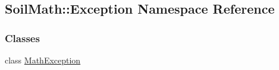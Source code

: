 \hypertarget{namespace_soil_math_1_1_exception}{}\subsection{Soil\+Math\+:\+:Exception Namespace Reference}
\label{namespace_soil_math_1_1_exception}
\subsubsection*{Classes}
\begin{DoxyCompactItemize}
\item 
class \hyperlink{class_soil_math_1_1_exception_1_1_math_exception}{Math\+Exception}
\end{DoxyCompactItemize}
